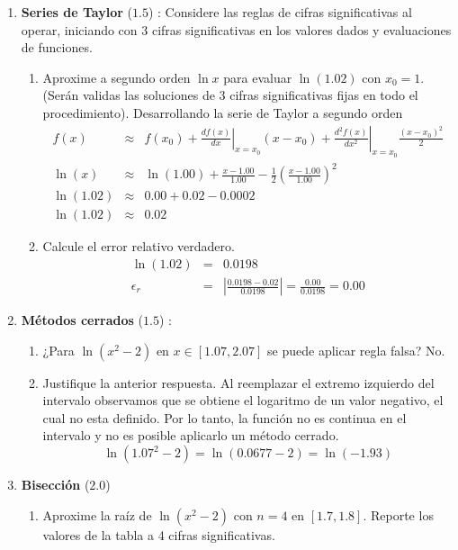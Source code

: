 \documentclass[12pt]{article}
\begin{document}
  \begin{enumerate}[leftmargin=*,widest=9]
    \item \textbf{Series de Taylor} ($1.5$) : Considere las reglas de cifras significativas al operar, iniciando con 3 cifras significativas en los valores dados y evaluaciones de funciones.
    \begin{enumerate}[label=\alph*]
    \item Aproxime a segundo orden $\ln x$ para evaluar $\ln (1.02)$ con $x_0 = 1$. (Serán validas las soluciones de 3 cifras significativas fijas en todo el procedimiento).
    Desarrollando la serie de Taylor a segundo orden
    \begin{eqnarray*}
    f(x) & \approx & f(x_0) + \left.\frac{df(x)}{dx}\right|_{x=x_0}(x-x_0)+ \left.\frac{d^2f(x)}{dx^2}\right|_{x=x_0}\frac{(x-x_0)^2}{2}\\
    \ln(x) & \approx & \ln(1.00) + \frac{x-1.00}{1.00} - \frac{1}{2}\left(\frac{x-1.00}{1.00}\right)^2 \\
    \ln(1.02) & \approx & 0.00 + 0.02 - 0.0002\\
    \ln(1.02) & \approx & 0.02
    \end{eqnarray*}
    \item Calcule el error relativo verdadero.
    \begin{eqnarray*}
    \ln(1.02) & = & 0.0198\\
    \epsilon_r & = & \left| \frac{0.0198 - 0.02}{0.0198} \right| = \frac{0.00}{0.0198} = 0.00  
    \end{eqnarray*}
    \end{enumerate}
    \item \textbf{Métodos cerrados} ($1.5$) :
    \begin{enumerate}[label=\alph*]
    \item ¿Para $\ln (x^2-2)$ en $x \in \left[ 1.07, 2.07 \right]$ se puede aplicar regla falsa?
    No.
    \item Justifique la anterior respuesta.
    Al reemplazar el extremo izquierdo del intervalo observamos que se obtiene el logaritmo de un valor negativo, el cual no esta definido. Por lo tanto, la función no es continua en el intervalo y no es posible aplicarlo un método cerrado.
   \[ \ln(1.07^2 - 2) = \ln(0.0677 -2 ) = \ln(-1.93) \]
    \end{enumerate}
    \item \textbf{Bisección} ($2.0$)
    \begin{enumerate}[label=\alph*]
    \item Aproxime la raíz de $\ln (x^2 - 2)$ con $n=4$ en $\left[1.7, 1.8\right]$. Reporte los valores de la tabla a 4 cifras significativas.

\end{enumerate}
\end{enumerate}
\end{document}
